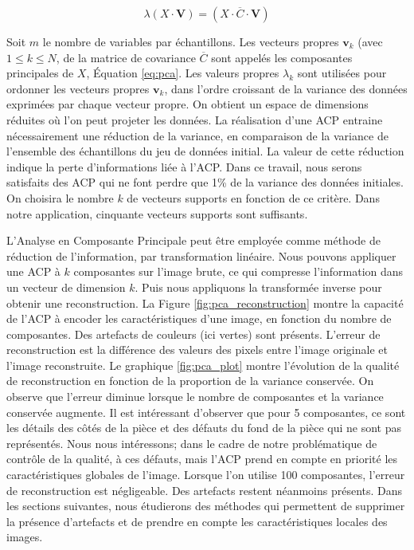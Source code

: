 \begin{equation} \label{eq:pca}
\lambda\left(X \cdot \mathbf{V}\right)=\left(X \cdot \overline{C} \cdot \mathbf{V}\right)
\end{equation}

Soit $m$ le nombre de variables par échantillons. Les vecteurs propres $\mathbf{v}_k$ (avec $1 \leq k \leq N$, de la matrice de covariance $\overline{C}$ sont appelés les composantes principales de $X$, Équation \ref{eq:pca}.
Les valeurs propres $\lambda_k$ sont utilisées pour ordonner les vecteurs propres $\mathbf{v}_k$, dans l'ordre croissant de la variance des données exprimées par chaque vecteur propre.
On obtient un espace de dimensions réduites où l'on peut projeter les données.
La réalisation d'une ACP entraine nécessairement une réduction de la variance, en comparaison de la variance de l'ensemble des échantillons du jeu de données initial.
La valeur de cette réduction indique la perte d'informations liée à l'ACP.
Dans ce travail, nous serons satisfaits des ACP qui ne font perdre que 1\% de la variance des données initiales.
On choisira le nombre $k$ de vecteurs supports en fonction de ce critère.
Dans notre application, cinquante vecteurs supports sont suffisants. 

L'Analyse en Composante Principale peut être employée comme méthode de réduction de l'information, par transformation linéaire.
Nous pouvons appliquer une ACP à $k$ composantes sur l'image brute, ce qui compresse l'information dans un vecteur de dimension $k$.
Puis nous appliquons la transformée inverse pour obtenir une reconstruction.
La Figure \ref{fig:pca_reconstruction} montre la capacité de l'ACP à encoder les caractéristiques d'une image, en fonction du nombre de composantes.
Des artefacts de couleurs (ici vertes) sont présents.
L'erreur de reconstruction est la différence des valeurs des pixels entre l'image originale et l'image reconstruite.
Le graphique \ref{fig:pca_plot} montre l'évolution de la qualité de reconstruction en fonction de la proportion de la variance conservée.
On observe que l'erreur diminue lorsque le nombre de composantes et la variance conservée augmente.
Il est intéressant d'observer que pour 5 composantes, ce sont les détails des côtés de la pièce et des défauts du fond de la pièce qui ne sont pas représentés.
Nous nous intéressons; dans le cadre de notre problématique de contrôle de la qualité, à ces défauts, mais l'ACP prend en compte en priorité les caractéristiques globales de l'image.
Lorsque l'on utilise 100 composantes, l'erreur de reconstruction est négligeable.
Des artefacts restent néanmoins présents.
Dans les sections suivantes, nous étudierons des méthodes qui permettent de supprimer la présence d'artefacts et de prendre en compte les caractéristiques locales des images.

